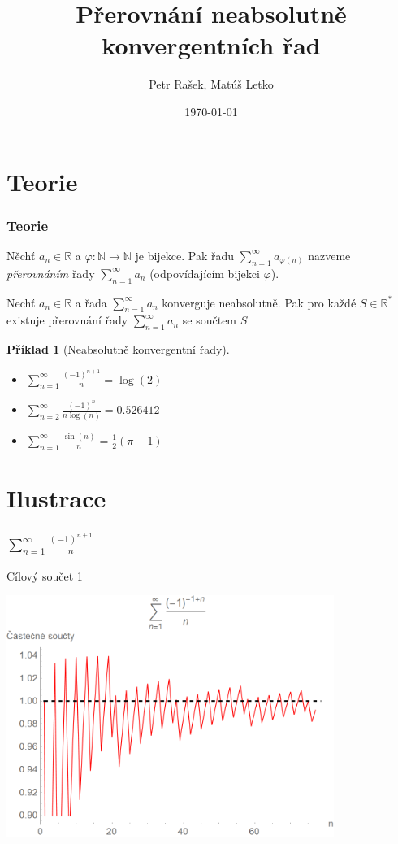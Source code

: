 \documentclass{beamer}
\title[Přerovnání řad]{Přerovnání neabsolutně konvergentních řad}
\author{Petr Rašek, Matúš Letko}
\institute[Charles University]{Charles University, Czech Republic}
\date{\today}
\newtheorem{exercise}[theorem]{Příklad}
\begin{document}
\begin{frame}
\titlepage

\end{frame}

\section{Teorie}
\label{sec:introduction}


\begin{frame}
  \frametitle{Teorie}
  \begin{Definition}
  Něchť \(a_n \in \mathbb{R}\) a \(\varphi : \mathbb{N} \rightarrow \mathbb{N}\) je bijekce. Pak řadu 
  \(\sum _{n=1} ^{\infty} a_{\varphi(n)}\) nazveme \textit{přerovnáním} řady \(\sum _{n=1} ^{\infty} a_n\) (odpovídajícím bijekci \(\varphi\)).
  \end{Definition}
  \begin{Theorem}[Riemannova] 
  Nechť \(a_n \in \mathbb{R}\) a řada \(\sum _{n=1} ^{\infty} a_n\) konverguje neabsolutně. Pak pro každé \(S \in \mathbb{R} ^\ast\) existuje přerovnání řady \(\sum _{n=1} ^{\infty} a_n\) se součtem \(S\)
  \end{Theorem}
  \begin{exercise}[Neabsolutně konvergentní řady]
    \begin{itemize}
        \item \(\sum _{n=1} ^{\infty} \frac{(-1)^{n+1}}{n} = \log(2)\)
        \item \(\sum _{n=2} ^{\infty} \frac{(-1)^{n}}{n\log(n)} = 0.526412\)
        \item \(\sum _{n=1} ^{\infty} \frac{\sin(n)}{n} = \frac{1}{2}(\pi - 1)\)
    \end{itemize}
  \end{exercise}
\end{frame}

\section{Ilustrace}
\begin{frame}
  \frametitle{\(\sum _{n=1} ^{\infty} \frac{(-1)^{n+1}}{n}\)}
  Cílový součet 1
  \begin{center}
    \includegraphics[width=0.8\textwidth]{serie1_1.png}
  \end{center}
\end{frame}
\end{document}
